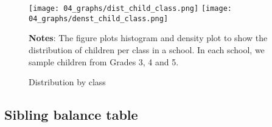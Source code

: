\documentclass[hidelinks,12pt]{article}
\begin{document}
\begin{singlespace}
\begin{figure}[H]
\centering
\caption{Distribution by class}\label{fig:g_dist_child_class}
\texttt{[image: 04\_graphs/dist\_child\_class.png]}
\texttt{[image: 04\_graphs/denst\_child\_class.png]}
\begin{minipage}{0.7\linewidth}
\vspace{3pt}
\footnotesize{\justify\textbf{Notes}: The figure plots histogram and density plot to show the distribution of children per class in a school. In each school, we sample children from Grades 3, 4 and 5.}
\end{minipage}
\end{figure}
\end{singlespace}

\subsection{Sibling balance table}\label{appendix:table1_s} %
\begingroup
\setlength{\tabcolsep}{2pt}  %
\begin{table}[H]
   \begin{singlespace}
    \centering
    \fontsize{12pt}{12pt}\selectfont  %
    \end{singlespace}
\end{table}
\endgroup
\end{document}
